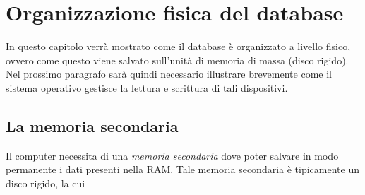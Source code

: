 \section{Organizzazione fisica del database}

In questo capitolo verrà mostrato come il database è organizzato a livello fisico, ovvero
come questo viene salvato sull'unità di memoria di massa (disco rigido). Nel prossimo paragrafo
sarà quindi necessario illustrare brevemente come il sistema operativo gestisce la lettura e
scrittura di tali dispositivi.

\subsection{La memoria secondaria}
Il computer necessita di una \emph{memoria secondaria} dove poter salvare in modo permanente
i dati presenti nella RAM. Tale memoria secondaria è tipicamente un disco rigido, la cui 
